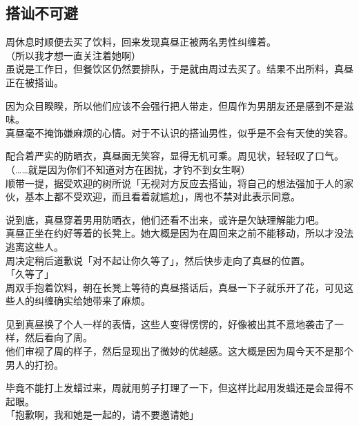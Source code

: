 \subsection{搭讪不可避}

周休息时顺便去买了饮料，回来发现真昼正被两名男性纠缠着。\\

（所以我才想一直关注着她啊）\\

虽说是工作日，但餐饮区仍然要排队，于是就由周过去买了。结果不出所料，真昼正在被搭讪。

因为众目睽睽，所以他们应该不会强行把人带走，但周作为男朋友还是感到不是滋味。\\

真昼毫不掩饰嫌麻烦的心情。对于不认识的搭讪男性，似乎是不会有天使的笑容。

配合着严实的防晒衣，真昼面无笑容，显得无机可乘。周见状，轻轻叹了口气。\\

（……就是因为你们不知道对方在困扰，才钓不到女生啊）\\

顺带一提，据受欢迎的树所说「无视对方反应去搭讪，将自己的想法强加于人的家伙，基本上都不受欢迎，而且看着就尴尬」，周也不禁对此表示同意。

说到底，真昼穿着男用防晒衣，他们还看不出来，或许是欠缺理解能力吧。\\

真昼正坐在约好等着的长凳上。她大概是因为在周回来之前不能移动，所以才没法逃离这些人。\\

周决定稍后道歉说「对不起让你久等了」，然后快步走向了真昼的位置。\\

「久等了」\\

周双手抱着饮料，朝在长凳上等待的真昼搭话后，真昼一下子就乐开了花，可见这些人的纠缠确实给她带来了麻烦。

见到真昼换了个人一样的表情，这些人变得愣愣的，好像被出其不意地袭击了一样，然后看向了周。\\

他们审视了周的样子，然后显现出了微妙的优越感。这大概是因为周今天不是那个男人的打扮。

毕竟不能打上发蜡过来，周就用剪子打理了一下，但这样比起用发蜡还是会显得不起眼。\\

「抱歉啊，我和她是一起的，请不要邀请她」\\


